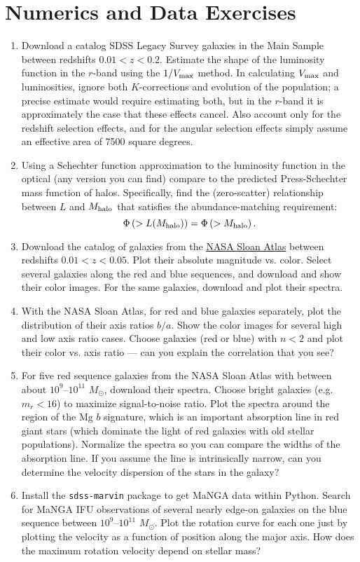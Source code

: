 \section{Numerics and Data Exercises}

\begin{enumerate}
\item Download a catalog SDSS Legacy Survey galaxies in the Main
Sample between redshifts $0.01 < z < 0.2$. Estimate the shape of the
luminosity function in the $r$-band using the $1/V_{\rm max}$
method. In calculating $V_{\rm max}$ and luminosities, ignore both
$K$-corrections and evolution of the population; a precise estimate
would require estimating both, but in the $r$-band it is approximately
the case that these effects cancel. Also account only for the redshift
selection effects, and for the angular selection effects simply assume
an effective area of 7500 square degrees.
\item Using a Schechter function approximation to the luminosity
function in the optical (any version you can find) compare to the
predicted Press-Schechter mass function of halos. Specifically, find
the (zero-scatter) relationship between $L$ and $M_{\rm halo}$ that
satisfies the abundance-matching requirement:
\begin{equation}
\Phi\left(>L(M_{\rm halo})\right) = \Phi\left(>M_{\rm halo}\right).
\end{equation}
\item Download the catalog of galaxies from
the \href{http://nsatlas.org}{NASA Sloan Atlas} between redshifts
$0.01 < z <0.05$. Plot their absolute magnitude vs. color. Select
several galaxies along the red and blue sequences, and download and
show their color images. For the same galaxies, download and plot
their spectra.
\item With the NASA Sloan Atlas, for red and blue galaxies separately, plot the
distribution of their axis ratios $b/a$. Show the color images for
several high and low axis ratio cases. Choose galaxies (red or blue)
with $n<2$ and plot their color vs. axis ratio --- can you explain the
correlation that you see?
\item For five red sequence galaxies from the NASA Sloan Atlas with
between about $10^9$--$10^{11}$ $M_\odot$, download their
spectra. Choose bright galaxies (e.g. $m_r < 16$) to maximize
signal-to-noise ratio. Plot the spectra around the region of the Mg
$b$ signature, which is an important absorption line in red giant
stars (which dominate the light of red galaxies with old stellar
populations). Normalize the spectra so you can compare the widths of
the absorption line. If you assume the line is intrinsically narrow,
can you determine the velocity dispersion of the stars in the galaxy?
\item Install the {\tt sdss-marvin} package to get MaNGA data within
Python. Search for MaNGA IFU observations of several nearly edge-on
galaxies on the blue sequence between $10^9$--$10^{11}$
$M_\odot$. Plot the rotation curve for each one just by plotting the
velocity as a function of position along the major axis. How does the
maximum rotation velocity depend on stellar mass?
\end{enumerate}


  
